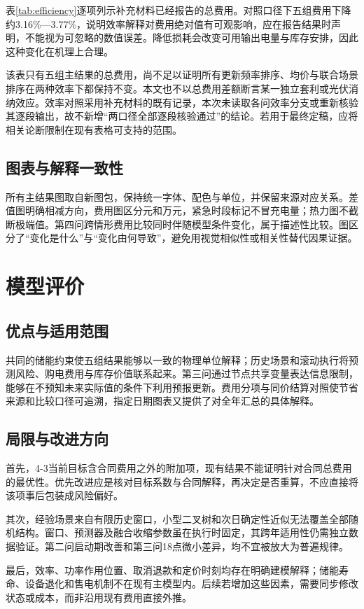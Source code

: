 
表\ref{tab:efficiency}逐项列示补充材料已经报告的总费用。对照口径下五组费用下降约3.16\%—3.77\%，说明效率解释对费用绝对值有可观影响，应在报告结果时声明，不能视为可忽略的数值误差。降低损耗会改变可用输出电量与库存安排，因此这种变化在机理上合理。

该表只有五组主结果的总费用，尚不足以证明所有更新频率排序、均价与联合场景排序在两种效率下都保持不变。本文也不以总费用差额断言某一独立套利或光伏消纳效应。效率对照采用补充材料的既有记录，本次未读取各问效率分支或重新核验其逐段输出，故不新增“两口径全部逐段核验通过”的结论。若用于最终定稿，应将相关论断限制在现有表格可支持的范围。

\subsection{图表与解释一致性}
所有主结果图取自新图包\cite{figures}，保持统一字体、配色与单位，并保留来源对应关系。差值图明确相减方向，费用图区分元和万元，紧急时段标记不冒充电量；热力图不截断极端值。第四问跨情形费用比较同时伴随模型条件变化，属于描述性比较。图区分了“变化是什么”与“变化由何导致”，避免用视觉相似性或相关性替代因果证据。

\section{模型评价}
\subsection{优点与适用范围}
共同的储能约束使五组结果能够以一致的物理单位解释；历史场景和滚动执行将预测风险、购电费用与库存价值联系起来。第三问通过节点共享变量表达信息限制，能够在不预知未来实际值的条件下利用预报更新。费用分项与同价结算对照使节省来源和比较口径可追溯，指定日期图表又提供了对全年汇总的具体解释。

\subsection{局限与改进方向}
首先，4-3当前目标含合同费用之外的附加项，现有结果不能证明针对合同总费用的最优性。优先改进应是核对目标系数与合同解释，再决定是否重算，不应直接将该项事后包装成风险偏好。

其次，经验场景来自有限历史窗口，小型二叉树和次日确定性近似无法覆盖全部随机结构。窗口、预测器及融合收缩参数虽在执行时固定，其跨年适用性仍需独立数据验证。第二问启动期改善和第三问18点微小差异，均不宜被放大为普遍规律。

最后，效率、功率作用位置、取消退款和定价时刻均存在明确建模解释；储能寿命、设备退化和售电机制不在现有主模型内。后续若增加这些因素，需要同步修改状态或成本，而非沿用现有费用直接外推。
